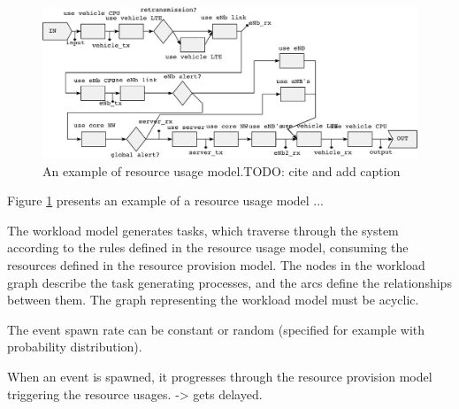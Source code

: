 \begin{figure}[]
  \begin{center}
    \includegraphics[width=\textwidth]{images/pse-tge-example-crop.pdf}
    \caption{An example of resource usage model.TODO: cite and add caption}
    \label{fig:resource-usage-model}
  \end{center}
\end{figure}

Figure \ref{fig:resource-usage-model} presents an example of a resource usage model ...

The workload model generates tasks, which traverse through the system according to the rules defined in the resource usage model, consuming the resources defined in the resource provision model. The nodes in the workload graph describe the task generating processes, and the arcs define the relationships between them. The graph representing the workload model must be acyclic.

The event spawn rate can be constant or random (specified for example with probability distribution).

When an event is spawned, it progresses through the resource provision model triggering the resource usages. -> gets delayed.


